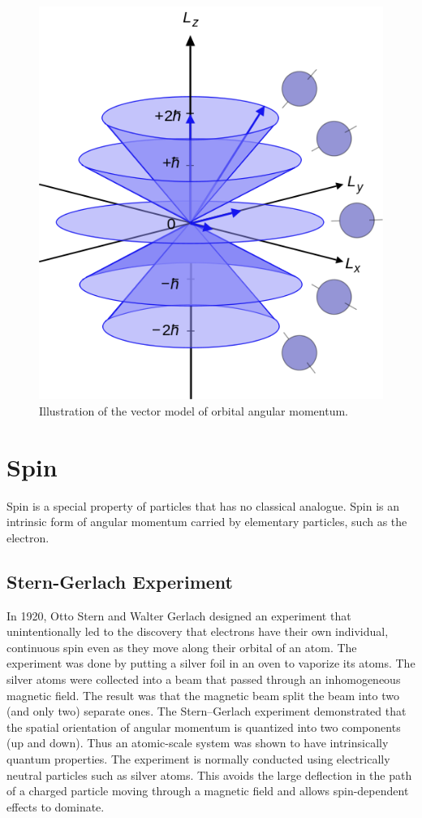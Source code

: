 \documentclass[
  9pt,
]{extbook}
\theoremstyle{definition}
\theoremstyle{definition}
\theoremstyle{definition}
\theoremstyle{remark}
\begin{document}
\begin{figure}

{\centering \includegraphics[width=0.5\linewidth]{./img/OEP_wiki2} 

}

\caption{Illustration of the vector model of orbital angular momentum.}\label{fig:Fig1c6}
\end{figure}

\hypertarget{Spin}{%
\chapter{Spin}\label{Spin}}

Spin is a special property of particles that has no classical analogue. Spin is an intrinsic form of angular momentum carried by elementary particles, such as the electron.

\hypertarget{stern-gerlach-experiment}{%
\section{Stern-Gerlach Experiment}\label{stern-gerlach-experiment}}

In 1920, Otto Stern and Walter Gerlach designed an experiment that unintentionally led to the discovery that electrons have their own individual, continuous spin even as they move along their orbital of an atom. The experiment was done by putting a silver foil in an oven to vaporize its atoms. The silver atoms were collected into a beam that passed through an inhomogeneous magnetic field. The result was that the magnetic beam split the beam into two (and only two) separate ones. The Stern--Gerlach experiment demonstrated that the spatial orientation of angular momentum is quantized into two components (up and down). Thus an atomic-scale system was shown to have intrinsically quantum properties. The experiment is normally conducted using electrically neutral particles such as silver atoms. This avoids the large deflection in the path of a charged particle moving through a magnetic field and allows spin-dependent effects to dominate.
\end{document}
